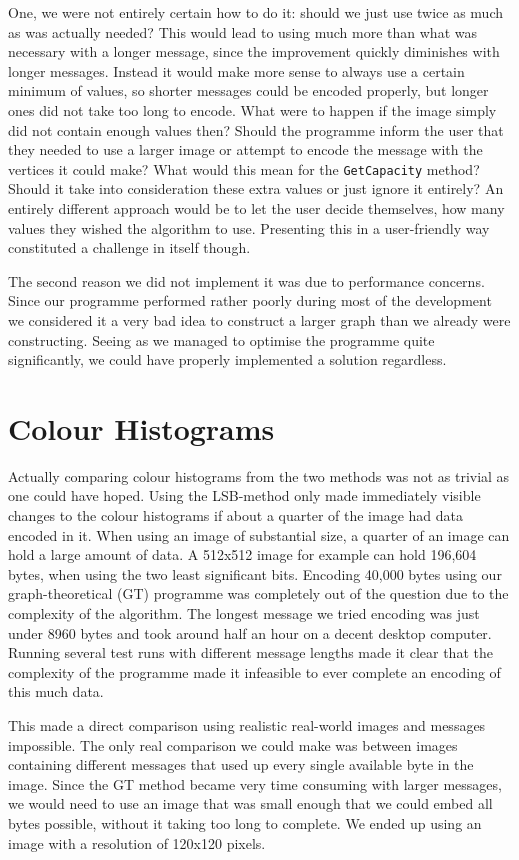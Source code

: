 One, we were not entirely certain how to do it: should we just use twice as much as was actually needed?
This would lead to using much more than what was necessary with a longer message, since the improvement quickly diminishes with longer messages.
Instead it would make more sense to always use a certain minimum of values, so shorter messages could be encoded properly, but longer ones did not take too long to encode.
What were to happen if the image simply did not contain enough values then? 
Should the programme inform the user that they needed to use a larger image or attempt to encode the message with the vertices it could make?
What would this mean for the \lstinline|GetCapacity| method? 
Should it take into consideration these extra values or just ignore it entirely?
An entirely different approach would be to let the user decide themselves, how many values they wished the algorithm to use. 
Presenting this in a user-friendly way constituted a challenge in itself though.

The second reason we did not implement it was due to performance concerns.
Since our programme performed rather poorly during most of the development we considered it a very bad idea to construct a larger graph than we already were constructing.
Seeing as we managed to optimise the programme quite significantly, we could have properly implemented a solution regardless.


\section{Colour Histograms}
\label{sec:colourhistograms}
Actually comparing colour histograms from the two methods was not as trivial as one could have hoped.
Using the LSB-method only made immediately visible changes to the colour histograms if about a quarter of the image had data encoded in it.
When using an image of substantial size, a quarter of an image can hold a large amount of data. 
A 512x512 image for example can hold 196,604 bytes, when using the two least significant bits.
Encoding 40,000 bytes using our graph-theoretical (GT) programme was completely out of the question due to the complexity of the algorithm.
The longest message we tried encoding was just under 8960 bytes and took around half an hour on a decent desktop computer.
Running several test runs with different message lengths made it clear that the complexity of the programme made it infeasible to ever complete an encoding of this much data.

This made a direct comparison using realistic real-world images and messages impossible. 
The only real comparison we could make was between images containing different messages that used up every single available byte in the image.
Since the GT method became very time consuming with larger messages, we would need to use an image that was small enough that we could embed all bytes possible, without it taking too long to complete.
We ended up using an image with a resolution of 120x120 pixels.

